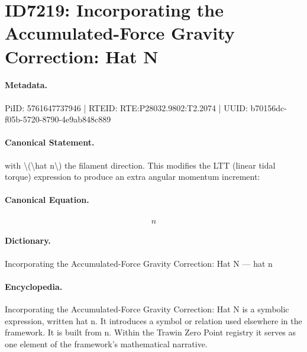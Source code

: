 \section*{ID7219: Incorporating the Accumulated-Force Gravity Correction: Hat N}
\paragraph{Metadata.}
PiID: 5761647737946 | RTEID: RTE:P28032.9802:T2.2074 | UUID: b70156dc-f05b-5720-8790-4e9ab848c889

\paragraph{Canonical Statement.}
with \textbackslash{}(\textbackslash{}hat n\textbackslash{}) the filament direction. This modifies the LTT (linear tidal torque) expression to produce an extra angular momentum increment:

\paragraph{Canonical Equation.}
\[
\hat n
\]

\paragraph{Dictionary.}
Incorporating the Accumulated-Force Gravity Correction: Hat N — hat n

\paragraph{Encyclopedia.}
Incorporating the Accumulated-Force Gravity Correction: Hat N is a symbolic expression, written hat n. It introduces a symbol or relation used elsewhere in the framework. It is built from n. Within the Trawin Zero Point registry it serves as one element of the framework's mathematical narrative.

